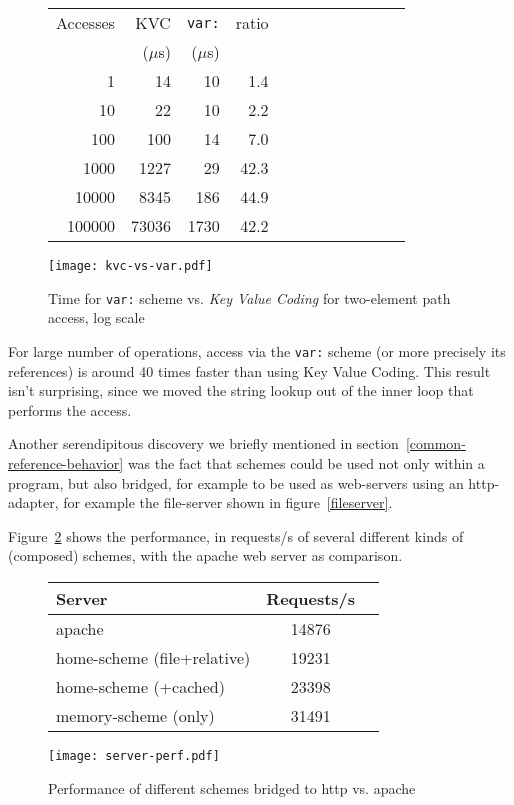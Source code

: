\documentclass[preprint,authoryear]{llncs}
\begin{document}
\begin{figure}
  \centering
\begin{minipage}[c]{0.38\textwidth}
\begin{tabular}{|r|r|r|r|r|r|r|r|r|r|r|r|} \hline
Accesses  & KVC& {\tt var:}   & ratio	\\ 
 & ($\mu$s) & ($\mu$s) & \\ \hline
1 & 14 & 10 & 1.4   \\ %
10 & 22 & 10 &   2.2 \\   %
100 & 100 & 14 &  7.0\\   %
1000 & 1227 & 29 &  42.3  \\  %
10000 & 8345 & 186 &   44.9 \\   %
100000 & 73036 & 1730 &    42.2 \\ \hline
\end{tabular}
\end{minipage}
\begin{minipage}[c]{0.38\textwidth}
\texttt{[image: kvc-vs-var.pdf]}
\end{minipage}
\caption{Time for  {\tt var:} scheme vs. \emph{Key Value Coding} for two-element path access, log scale}
\label{var-speed}
\end{figure}

For large number of operations, access via the {\tt var:} scheme (or more precisely its references) is
around 40 times faster than using Key Value Coding.  This result isn't surprising, since we
moved the string lookup out of the inner loop that performs the access.

Another serendipitous discovery we briefly mentioned in section~\ref{common-reference-behavior} was
the fact that schemes could be used not only within a program, but also bridged, for example to be used
as web-servers using an http-adapter, for example the file-server shown in figure~\ref{fileserver}.

Figure~\ref{http-server-speed} shows the performance, in requests/s of several different kinds of (composed)
schemes, with the apache web server as comparison.  

\begin{figure}
\begin{minipage}[c]{0.58\textwidth}
\begin{tabular}{|l|c|c|} \hline
Server   &  Requests/s    \\ \hline
apache & 	14876	      \\ %
home-scheme (file+relative) &  19231   \\ %
home-scheme (+cached)  &  23398  \\ %
memory-scheme (only) &  31491  \\ \hline
\end{tabular}
\end{minipage}
\begin{minipage}[c]{0.58\textwidth}
\texttt{[image: server-perf.pdf]}
\end{minipage}
\caption{Performance of different schemes bridged to http vs. apache}
\label{http-server-speed}
\end{figure}
\end{document}
